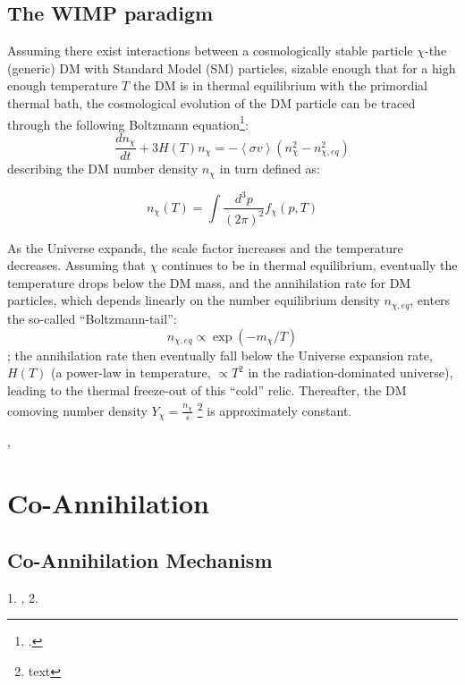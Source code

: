 \documentclass[compress,xcolor=table]{beamer}
\begin{document}
\subsection{The WIMP paradigm}
\begin{frame}{}
Assuming there exist interactions between a cosmologically stable particle $\chi$-the (generic) DM with Standard Model (SM) particles, sizable enough that for a high enough temperature $T$ the DM is in thermal equilibrium with the primordial thermal bath, the cosmological evolution of the DM particle can be traced through the following Boltzmann equation\footcite{Arcadi2017}:
\[
\frac{dn_{\chi}}{dt}+3H(T)n_{\chi}=-\left\langle \sigma v \right\rangle \left(n^2_{\chi}-n^2_{\chi,eq}\right)
\]
describing the DM number density $n_{\chi}$ in turn defined as:

\[
n_{\chi}(T)=\int\frac{d^3p}{(2\pi)^2}f_{\chi}(p,T)
\]

\end{frame}
\begin{frame}{}

As the Universe expands, the scale factor increases and the temperature decreases. Assuming that $\chi$ continues to be in thermal equilibrium, eventually the temperature drops below the DM mass, and the annihilation rate for DM particles, which depends linearly on the number equilibrium density $n_{\chi,eq}$, enters the so-called “Boltzmann-tail”: 
\[
n_{\chi,eq}\propto\exp(-m_{\chi}/T)
\]; 
the annihilation rate then eventually fall below the Universe expansion rate, $H(T)$ (a power-law in temperature, $\propto T^2$ in the radiation-dominated universe), leading to the thermal freeze-out of this “cold” relic. Thereafter, the DM comoving number density $Y_{\chi}=\frac{n_{\chi}}{s}$ \footnote{text} is approximately constant.


, \cite{Arcadi2017}
\end{frame}
\section{Co-Annihilation}
\subsection{Co-Annihilation Mechanism} 
\begin{frame}{}

	\begin{spacing}{0.5}
		{\tiny
			1. ,\cite{Ibarra2014}
			2. \cite{Bertone2005,Giacchino2013}
		}
	\end{spacing}

\end{frame}
\end{document}
